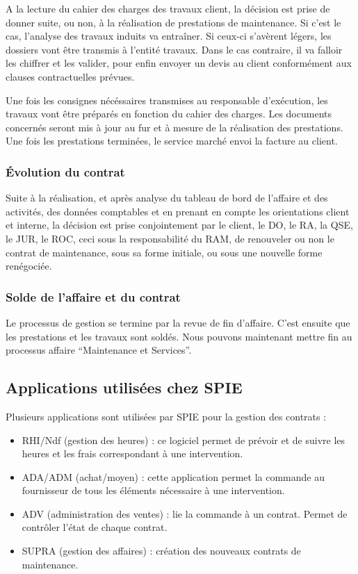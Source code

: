 A la lecture du cahier des charges des travaux client, la décision est prise de donner suite, ou non, à la réalisation de prestations de maintenance. Si c'est le cas, l'analyse des travaux induits va entraîner. Si ceux-ci s'avèrent légers, les dossiers vont être transmis à l'entité travaux. Dans le cas contraire, il va falloir les chiffrer et les valider, pour enfin envoyer un devis au client conformément aux clauses contractuelles prévues.

Une fois les consignes nécéssaires transmises au responsable d'exécution, les travaux vont être préparés en fonction du cahier des charges. Les documents concernés seront mis à jour au fur et à mesure de la réalisation des prestations. Une fois les prestations terminées, le service marché envoi la facture au client.

\subsubsection{Évolution du contrat}

Suite à la réalisation, et après analyse du tableau de bord de l'affaire et des activités, des données comptables et en prenant en compte les orientations client et interne, la décision est prise conjointement par le client, le DO, le RA, la QSE, le JUR, le ROC, ceci sous la responsabilité du RAM, de renouveler ou non le contrat de maintenance, sous sa forme initiale, ou sous une nouvelle forme renégociée.

\subsubsection{Solde de l’affaire et du contrat}

Le processus de gestion se termine par la revue de fin d'affaire. C'est ensuite que les prestations et les travaux sont soldés. Nous pouvons maintenant mettre fin au processus affaire ``Maintenance et Services''.

\subsection{Applications utilisées chez SPIE}

Plusieurs applications sont utilisées par SPIE pour la gestion des contrats :

\begin{itemize}
\item RHI/Ndf (gestion des heures) : ce logiciel permet de prévoir et de suivre les heures et les frais correspondant à une intervention.
\item ADA/ADM (achat/moyen) : cette application permet la commande au fournisseur de tous les éléments nécessaire à une intervention.
\item ADV (administration des ventes) : lie la commande à un contrat. Permet de contrôler l’état de chaque contrat.
\item SUPRA (gestion des affaires) : création des nouveaux contrats de maintenance.
\end{itemize}

